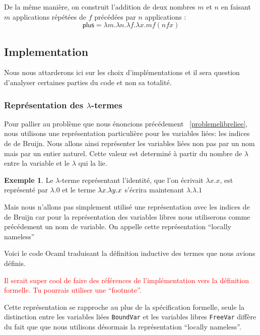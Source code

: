 \documentclass {article}
\newcommand{\codefrom}[3]
           {}
\theoremstyle{definition}
\newtheorem{example}{Exemple}
\theoremstyle{remark}
\newcommand{\todo}[1]{\textcolor{red}{#1}}
\begin{document}
De la même manière, on construit l'addition de deux nombres \(m\) et
\(n\) en faisant \(m\) applications répétées de \(f\) précédées par
\(n\) applications :
%
\[
\mathsf{plus} = \lambda m. \lambda n. \lambda f. \lambda x. m f (n f x)
\]


\subsection{Implementation}

Nous nous attarderons ici sur les choix d'implémentations et il sera question
d'analyser certaines parties du code et non sa totalité.

\subsubsection{Représentation des $\lambda$-termes}
 
Pour pallier au problème que nous énoncions précédement ~\ref{problemelibreliee}, nous
utilisons une représentation particulière pour les variables liées:
les indices de de Bruijn.  Nous allons ainsi représenter les variables
liées non pas par un nom mais par un entier naturel. Cette valeur est determiné 
à partir du nombre de $\lambda$ entre la variable et le $\lambda$ qui la lie.

\begin{example}
  Le $\lambda$-terme représentant l'identité, que l'on écrivait \(\lambda x.x\), est représenté par \(\lambda.0\)
  et le terme $\lambda x. \lambda y. x$ s'écrira maintenant $\lambda.\lambda.1$ 
\end{example}

Mais nous n'allons pas simplement utilisé une représentation avec les indices de de Bruijn 
car pour la représentation des variables libres nous utiliserons comme précédement un nom
de variable. On appelle cette représentation ``locally nameless'' ~\citep{chargueraud:locally-nameless}

Voici le code Ocaml traduisant la définition inductive des termes que nous avions 
définis.

\codefrom{untyped}{lambda}{untyped_term}

\todo{Il serait super cool de faire des références de l'implémentation
  vers la définition formelle. Tu pourrais utiliser une ``footnote''.}

Cette représentation se rapproche au plus de la spécification
formelle, seule la distinction entre les variables liées \lstinline!BoundVar! et les
variables libres \lstinline!FreeVar! diffère du fait que que nous utilisons désormais 
la représentation ``locally nameless''.
\end{document}
